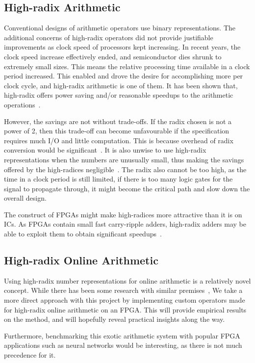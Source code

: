 \subsection{High-radix Arithmetic}
Conventional designs of arithmetic operators use binary representations.
The additional concerns of high-radix operators did not provide justifiable
improvements as clock speed of processors kept increasing.
In recent years, the clock speed increase effectively ended, and semiconductor
dies shrunk to extremely small sizes.
This means the relative processing time available in a clock period increased.
This enabled and drove the desire for accomplishing more per clock cycle, and
high-radix arithmetic is one of them.
It has been shown that, high-radix offers power saving and/or reasonable
speedups to the arithmetic operations~\cite{Catanzaro1}\cite{Amin1}\cite{Chen1}.

However, the savings are not without trade-offs.
If the radix chosen is not a power of 2, then this trade-off can become
unfavourable if the specification requires much I/O
and little computation.
This is because overhead of radix conversion would be significant~\cite{Whyte1}.
It is also unwise to use high-radix representations when the numbers are
unusually small, thus making the savings offered by the high-radices
negligible~\cite{Catanzaro1}.
The radix also cannot be too high, as the time in a clock period is still
limited, if there is too many logic gates for the signal to propagate through,
it might become the critical path and slow down the overall design.

The construct of FPGAs might make high-radices more attractive than it is on
ICs.
As FPGAs contain small fast carry-ripple adders, high-radix adders may be able
to exploit them to obtain significant speedups~\cite{Kornerup1}.

\subsection{High-radix Online Arithmetic}
Using high-radix number representations for online arithmetic is a
relatively novel concept.
While there has been some research with similar
premises~\cite{Lynch1}\cite{Lynch2},
We take a more direct approach with this project by implementing custom
operators made for high-radix online arithmetic on an FPGA.
This will provide empirical results on the method, and will hopefully reveal
practical insights along the way.

Furthermore, benchmarking this exotic arithmetic system with popular FPGA
applications such as neural networks would be interesting, as there is not
much precedence for it.